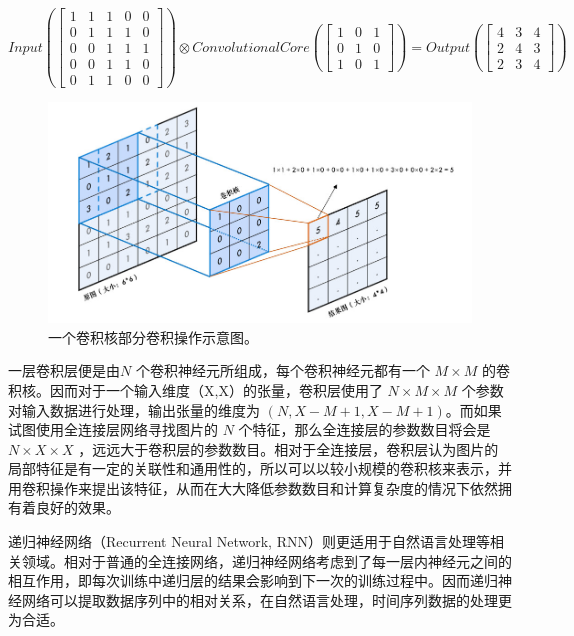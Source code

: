 \renewcommand\arraystretch{1.0}
\begin{equation}
    Input(\left[ \begin{array}{ccccc}
        1&1&1&0&0\\
        0&1&1&1&0\\
        0&0&1&1&1\\
        0&0&1&1&0\\
        0&1&1&0&0
    \end{array} \right])
    \otimes Convolutional Core(\left[ \begin{array}{ccc}
        1&0&1\\
        0&1&0\\
        1&0&1
    \end{array} \right]) = Output(\left[ \begin{array}{ccc}
        4 &3 &4\\
        2 &4&3\\
        2&3&4
    \end{array} \right])
    \label{eq:con}
\end{equation}

\begin{figure}
    \centering
    \includegraphics[width=0.7\columnwidth]{pic/con.jpg}
    \caption{一个卷积核部分卷积操作示意图\supercite{con}。}
    \label{fig:con}
\end{figure}

一层卷积层便是由$N$ 个卷积神经元所组成，每个卷积神经元都有一个 $M \times M$ 的卷积核。因而对于一个输入维度（X,X）的张量，卷积层使用了 $N\times M\times M$ 个参数对输入数据进行处理，输出张量的维度为 $(N,X-M+1,X-M+1)$。而如果试图使用全连接层网络寻找图片的 $N$ 个特征，那么全连接层的参数数目将会是 $N\times X\times X$ ，远远大于卷积层的参数数目。相对于全连接层，卷积层认为图片的局部特征是有一定的关联性和通用性的，所以可以以较小规模的卷积核来表示，并用卷积操作来提出该特征，从而在大大降低参数数目和计算复杂度的情况下依然拥有着良好的效果。

递归神经网络（Recurrent Neural Network, RNN）则更适用于自然语言处理等相关领域。相对于普通的全连接网络，递归神经网络考虑到了每一层内神经元之间的相互作用，即每次训练中递归层的结果会影响到下一次的训练过程中。因而递归神经网络可以提取数据序列中的相对关系，在自然语言处理，时间序列数据的处理更为合适。

